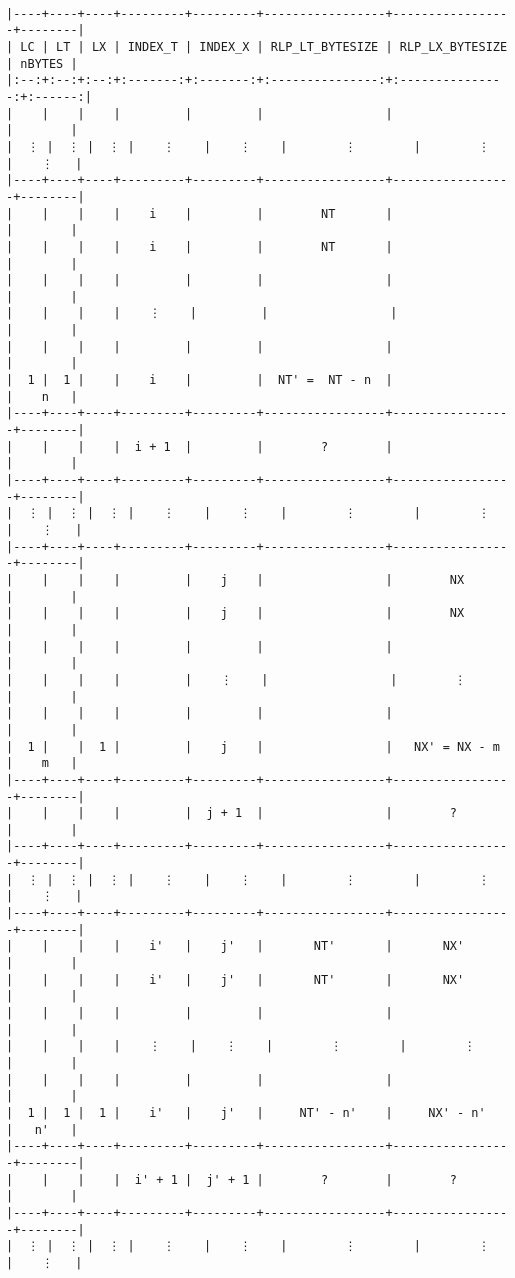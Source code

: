 \documentclass[varwidth=\maxdimen,margin=0.5cm,multi={verbatim}]{standalone}
\begin{document}
\begin{verbatim}

|----+----+----+---------+---------+-----------------+-----------------+--------|
| LC | LT | LX | INDEX_T | INDEX_X | RLP_LT_BYTESIZE | RLP_LX_BYTESIZE | nBYTES |
|:--:+:--:+:--:+:-------:+:-------:+:---------------:+:---------------:+:------:|
|    |    |    |         |         |                 |                 |        |
|  ⋮ |  ⋮ |  ⋮ |    ⋮    |    ⋮    |        ⋮        |        ⋮        |    ⋮   |
|----+----+----+---------+---------+-----------------+-----------------+--------|
|    |    |    |    i    |         |        NT       |                 |        |
|    |    |    |    i    |         |        NT       |                 |        |
|    |    |    |         |         |                 |                 |        |
|    |    |    |    ⋮    |         |                 |                 |        |
|    |    |    |         |         |                 |                 |        |
|  1 |  1 |    |    i    |         |  NT' =  NT - n  |                 |    n   |
|----+----+----+---------+---------+-----------------+-----------------+--------|
|    |    |    |  i + 1  |         |        ?        |                 |        |
|----+----+----+---------+---------+-----------------+-----------------+--------|
|  ⋮ |  ⋮ |  ⋮ |    ⋮    |    ⋮    |        ⋮        |        ⋮        |    ⋮   |
|----+----+----+---------+---------+-----------------+-----------------+--------|
|    |    |    |         |    j    |                 |        NX       |        |
|    |    |    |         |    j    |                 |        NX       |        |
|    |    |    |         |         |                 |                 |        |
|    |    |    |         |    ⋮    |                 |        ⋮        |        |
|    |    |    |         |         |                 |                 |        |
|  1 |    |  1 |         |    j    |                 |   NX' = NX - m  |    m   |
|----+----+----+---------+---------+-----------------+-----------------+--------|
|    |    |    |         |  j + 1  |                 |        ?        |        |
|----+----+----+---------+---------+-----------------+-----------------+--------|
|  ⋮ |  ⋮ |  ⋮ |    ⋮    |    ⋮    |        ⋮        |        ⋮        |    ⋮   |
|----+----+----+---------+---------+-----------------+-----------------+--------|
|    |    |    |    i'   |    j'   |       NT'       |       NX'       |        |
|    |    |    |    i'   |    j'   |       NT'       |       NX'       |        |
|    |    |    |         |         |                 |                 |        |
|    |    |    |    ⋮    |    ⋮    |        ⋮        |        ⋮        |        |
|    |    |    |         |         |                 |                 |        |
|  1 |  1 |  1 |    i'   |    j'   |     NT' - n'    |     NX' - n'    |   n'   |
|----+----+----+---------+---------+-----------------+-----------------+--------|
|    |    |    |  i' + 1 |  j' + 1 |        ?        |        ?        |        |
|----+----+----+---------+---------+-----------------+-----------------+--------|
|  ⋮ |  ⋮ |  ⋮ |    ⋮    |    ⋮    |        ⋮        |        ⋮        |    ⋮   |


\end{verbatim}
\end{document}
